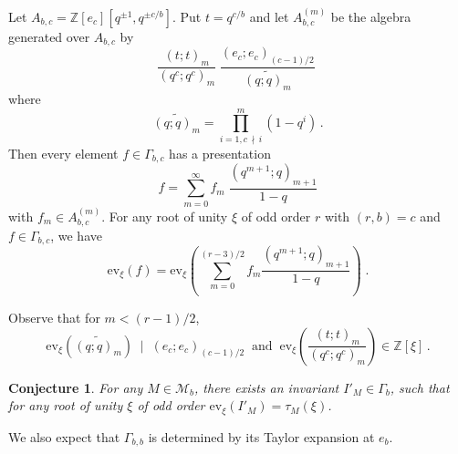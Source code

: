 \documentclass[12pt]{amsart}
\theoremstyle{plain}
\newtheorem*{conjecture}{Conjecture}
\theoremstyle{definition}
\def\BZ{\mathbb Z}
\def\M{\mathcal M}
\def\Z{\BZ}
\def\ev{\mathrm{ev}}
\begin{document}
Let $A_{b,c}=\Z[e_c][q^{\pm 1}, q^{\pm c/b}]$.
Put $t=q^{c/b}$ and let $A^{(m)}_{b,c}$ be the algebra generated over  $A_{b,c}$
by
$$\frac{(t;t)_m}{(q^c;q^c)_{m}}\;
 \frac{(e_c;e_c)_{(c-1)/2}}{\widetilde {(q;q)_m}}\; $$
where $$\widetilde{(q;q)_m}=\prod^m_{i=1, c\, \nmid\,  i}(1-q^i)\, .$$
Then
every element $f\in \Gamma_{b,c}$ has a presentation
$$f=\sum^\infty_{m=0} f_m \; \frac{(q^{m+1};q)_{m+1}}{1-q}
$$
with $f_m\in A^{(m)}_{b,c}$.
For any root of unity $\xi$ of odd order $r$ with $(r,b)=c$
and $f\in \Gamma_{b,c}$, we have
$$ \ev_\xi (f)= \ev_\xi \left(\sum^{(r-3)/2}_{m=0} f_m \frac{(q^{m+1};q)_{m+1}}{1-q}
\right)\; .$$



Observe that for $m<(r-1)/2$,
$$
\ev_\xi (\widetilde {(q;q)_{m}}) \; \mid\;
(e_c;e_c)_{(c-1)/2}
\;\;\text{and}\;\;
\ev_\xi \left(\frac{(t;t)_m}{(q^c;q^c)_{m}}
\right) \in \Z[\xi]\, .$$



\begin{conjecture}
For any $M\in \M_b$,
there exists an invariant $I'_M \in \Gamma_b$, such that
for any root of unity $\xi$ of odd order
$\ev_\xi(I'_M)=\tau_M(\xi)$.
\end{conjecture}

We also expect that $\Gamma_{b,b}$ is determined by its Taylor
expansion at $e_b$.


\end{document}
